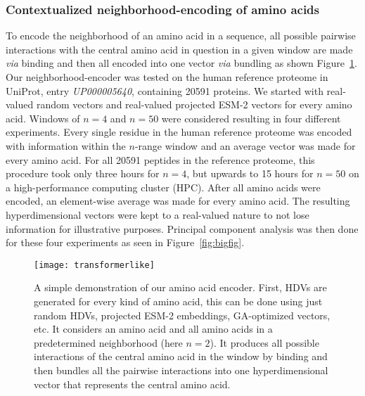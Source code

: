\subsubsection*{Contextualized neighborhood-encoding of amino acids}\label{sssec:trans}
To encode the neighborhood of an amino acid in a sequence, all possible pairwise interactions with the central amino acid in question in a given window are made \textit{via} binding and then all encoded into one vector \textit{via} bundling as shown Figure~\ref{fig:AAtr}. Our neighborhood-encoder was tested on the human reference proteome in UniProt, entry \textit{UP000005640}, containing 20591 proteins. We started with real-valued random vectors and real-valued projected ESM-2 vectors for every amino acid. Windows of $n = 4$ and $n = 50$ were considered resulting in four different experiments. Every single residue in the human reference proteome was encoded with information within the $n$-range window and an average vector was made for every amino acid. For all 20591 peptides in the reference proteome, this procedure took only three hours for $n = 4$, but upwards to 15 hours for $n = 50$ on a high-performance computing cluster (HPC). After all amino acids were encoded, an element-wise average was made for every amino acid. The resulting hyperdimensional vectors were kept to a real-valued nature to not lose information for illustrative purposes. Principal component analysis was then done for these four experiments as seen in Figure~\ref{fig:bigfig}. 

\begin{figure}[ht!]
    \centering
    \texttt{[image: transformerlike]}
    \caption{A simple demonstration of our amino acid encoder. First, HDVs are generated for every kind of amino acid, this can be done using just random HDVs, projected ESM-2 embeddings, GA-optimized vectors, etc. It considers an amino acid and all amino acids in a predetermined neighborhood (here $n = 2$). It produces all possible interactions of the central amino acid in the window by binding and then bundles all the pairwise interactions into one hyperdimensional vector that represents the central amino acid.}\label{fig:AAtr}
\end{figure}

